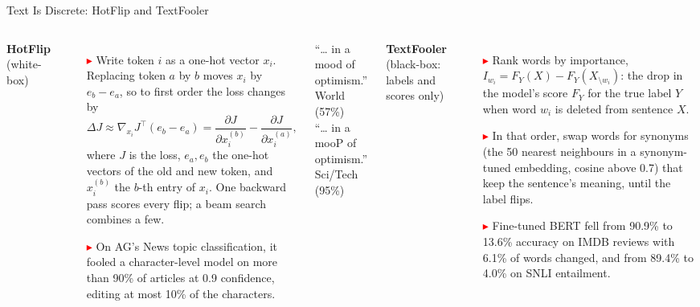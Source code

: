 \begin{frame}{Text Is Discrete: HotFlip and TextFooler}
  \begin{columns}[T,onlytextwidth]
      {\footnotesize\textbf{HotFlip} (white-box)\par}
      \begin{itemize}\footnotesize\itemsep0.25em
        \item[\textcolor{red}{$\blacktriangleright$}] Write token $i$ as a one-hot vector $x_i$. Replacing token $a$ by $b$ moves $x_i$ by $e_b - e_a$, so to first order the loss changes by
          \[ \Delta J \approx \nabla_{x_i} J^{\top}(e_b - e_a) = \frac{\partial J}{\partial x_i^{(b)}} - \frac{\partial J}{\partial x_i^{(a)}}, \]
          where $J$ is the loss, $e_a, e_b$ the one-hot vectors of the old and new token, and $x_i^{(b)}$ the $b$-th entry of $x_i$. One backward pass scores every flip; a beam search combines a few.
        \item[\textcolor{red}{$\blacktriangleright$}] On AG's News topic classification, it fooled a character-level model on more than 90\% of articles at 0.9 confidence, editing at most 10\% of the characters.
      \end{itemize}
      \vspace{0.2em}
      {\scriptsize ``\ldots{} in a mood of optimism.'' World (57\%)\\ ``\ldots{} in a mooP of optimism.'' Sci/Tech (95\%)\par}
      {\footnotesize\textbf{TextFooler} (black-box: labels and scores only)\par}
      \begin{itemize}\footnotesize\itemsep0.25em
        \item[\textcolor{red}{$\blacktriangleright$}] Rank words by importance, $I_{w_i} = F_Y(X) - F_Y(X_{\setminus w_i})$: the drop in the model's score $F_Y$ for the true label $Y$ when word $w_i$ is deleted from sentence $X$.
        \item[\textcolor{red}{$\blacktriangleright$}] In that order, swap words for synonyms (the 50 nearest neighbours in a synonym-tuned embedding, cosine above 0.7) that keep the sentence's meaning, until the label flips.
        \item[\textcolor{red}{$\blacktriangleright$}] Fine-tuned BERT fell from 90.9\% to 13.6\% accuracy on IMDB reviews with 6.1\% of words changed, and from 89.4\% to 4.0\% on SNLI entailment.
      \end{itemize}

\end{columns}
\end{frame}
